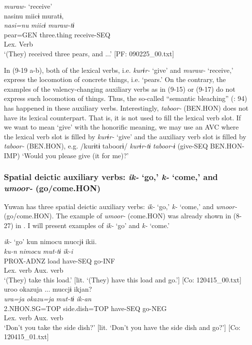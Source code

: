 \ex \textit{muraw-} ‘receive’\\
 \gllll  nasinu  miicɨ  muratɨ,\\
    \textit{nasi=nu}  \textit{miicɨ}  \textit{muraw{}-tɨ}\\
    pear=GEN  three.thing  receive-SEQ\\
        Lex. Verb\\
    \glt     ‘(They) received three pears, and ...’ [PF: 090225\_00.txt]
  \z
\z

In (9-19 a-b), both of the lexical verbs, i.e. \textit{kurɨr-} ‘give’ and \textit{muraw-} ‘receive,’ express the locomotion of concrete things, i.e. ‘pears.’ On the contrary, the examples of the valency-changing auxiliary verbs as in (9-15) or (9-17) do not express such locomotion of things. Thus, the so-called “semantic bleaching” (\citealt{HopperTraugott2003}: 94) has happened in these auxiliary verbs. Interestingly, \textit{taboor-} (BEN.HON) does not have its lexical counterpart. That is, it is not used to fill the lexical verb slot. If we want to mean ‘give’ with the honorific meaning, we may use an AVC where the lexical verb slot is filled by \textit{kurɨr-} ‘give’ and the auxiliary verb slot is filled by \textit{taboor-} (BEN.HON), e.g. /kurɨtɨ taboorɨ/ \textit{kurɨr-tɨ} \textit{taboor-ɨ} (give-SEQ BEN.HON-IMP) ‘Would you please give (it for me)?’

\subsubsection{Spatial deictic auxiliary verbs: \textit{ik-} ‘go,’ \textit{k-} ‘come,’ and \textit{umoor-} (go/come.HON)}\label{sec:9.1.1.4}

Yuwan has three spatial deictic auxiliary verbs: \textit{ik-} ‘go,’ \textit{k-} ‘come,’ and \textit{umoor-} (go/come.HON). The example of \textit{umoor-} (come.HON) was already shown in (8-27) in . I will present examples of \textit{ik-} ‘go’ and \textit{k-} ‘come.’

\ea  
\exi{}\textit{ik-} ‘go’ \label{ex:9.20}
\ea %
   \gllll   kun  {\textbar}nimocu{\textbar}  muccjɨ  ikii.\\
      \textit{ku-n}  \textit{nimocu}  \textit{mut-tɨ}  \textit{ik{}-i}\\
      PROX-ADNZ  load  have-SEQ  go-INF\\
          Lex. verb  Aux. verb\\
      \glt       ‘(They) take this load.’ [lit. ‘(They) have this load and go.’] [Co: 120415\_00.txt]
\ex 
\gllll   uroo  {\textbar}okazu{\textbar}ja  ...  muccjɨ  ikjan?\\
      \textit{ura=ja}  \textit{okazu=ja}    \textit{mut-tɨ}  \textit{ik{}-an}\\
      2.NHON.SG=TOP  side.dish=TOP    have-SEQ  go-NEG\\
            Lex. verb  Aux. verb\\
      \glt       ‘Don’t you take the side dish?’ [lit. ‘Don’t you have the side dish and go?’] [Co: 120415\_01.txt]

